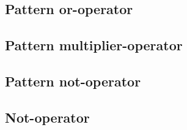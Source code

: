\subsection{Pattern or-operator}



\subsection{Pattern multiplier-operator}



\subsection{Pattern not-operator}



\subsection{Not-operator}


